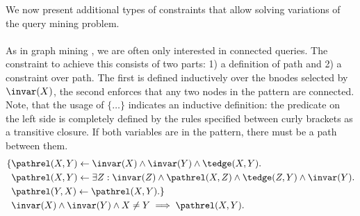We now present additional types of constraints that allow solving variations of the query mining problem.

\paragraph{\Connectedness} As in graph mining \cite{farmer}, we are often only interested in connected queries.
 The constraint to achieve this consists of two parts: 1) a definition of path and 2) a constraint over path. The first is defined inductively over the bnodes selected by $\invar(X)$, the second enforces that any two nodes in the pattern are connected. Note, that the usage of $\{\dots\}$ indicates an inductive definition: the predicate on the left side is completely defined by the rules specified between curly brackets as a transitive closure. If both variables are in the pattern, there must be a path between them. %
\begin{equation}
  \begin{aligned}
    \{ &\pathrel(X,Y) \leftarrow \invar(X) \wedge \invar(Y) \wedge \tedge(X,Y). \\
       &\pathrel(X,Y) \leftarrow  \exists Z: \invar(Z) \wedge \pathrel(X,Z) \wedge \tedge(Z,Y) \wedge \invar(Y). \\
       &\pathrel(Y,X) \leftarrow  \pathrel(X,Y).\}\\
       &\invar(X) \wedge \invar(Y) \wedge X \neq Y \implies \pathrel(X,Y).
  \end{aligned}
  \label{constr:connectedness}
\end{equation}

